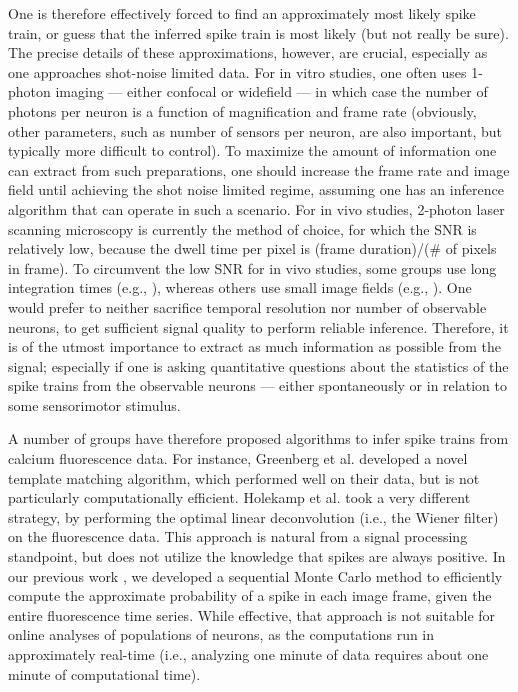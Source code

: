 One is therefore effectively forced to find an approximately most likely spike train, or guess that the inferred spike train is most likely (but not really be sure).  The precise details of these approximations, however, are crucial, especially as one approaches shot-noise limited data. For in vitro studies, one often uses 1-photon imaging --- either confocal or widefield --- in which case the number of photons per neuron is a function of magnification and frame rate (obviously, other parameters, such as number of sensors per neuron, are also important, but typically more difficult to control).  To maximize the amount of information one can extract from such preparations, one should increase the frame rate and image field until achieving the shot noise limited regime, assuming one has an inference algorithm that can operate in such a scenario.  For in vivo studies, 2-photon laser scanning microscopy is currently the method of choice, for which the SNR is relatively low,  because the dwell time per pixel is (frame duration)/($\#$ of pixels in frame).  To circumvent the low SNR for in vivo studies, some groups use long integration times (e.g., \cite{OhkiReid06}), whereas others use small image fields (e.g., \cite{KerrHelmchen07}).  One would prefer to neither sacrifice temporal resolution nor number of observable neurons, to get sufficient signal quality to perform reliable inference.  Therefore, it is of the utmost importance to extract as much information as possible from the signal; especially if one is asking quantitative questions about the statistics of the spike trains from the observable neurons --- either spontaneously or in relation to some sensorimotor stimulus.


A number of groups have therefore proposed algorithms to infer spike trains from calcium fluorescence data.  For instance, Greenberg et al. \cite{GreenbergKerr08} developed a novel template matching algorithm, which performed well on their data, but is not particularly computationally efficient.  Holekamp et al. \cite{HolekampHoly08} took a very different strategy, by performing the optimal linear deconvolution (i.e., the Wiener filter) on the fluorescence data.  This approach is natural from a signal processing standpoint, but does not utilize the knowledge that spikes are always positive.  In our previous work \cite{VogelsteinPaninski09}, we developed a sequential Monte Carlo method to efficiently compute the approximate probability of a spike in each image frame, given the entire fluorescence time series.   While effective, that approach is not suitable for online analyses of populations of neurons, as the computations run in approximately real-time (i.e., analyzing one minute of data requires about one minute of computational time).

